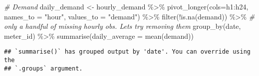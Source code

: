 \documentclass[
]{article}
\newenvironment{Shaded}{\begin{snugshade}}{\end{snugshade}}
\newcommand{\AttributeTok}[1]{\textcolor[rgb]{0.77,0.63,0.00}{#1}}
\newcommand{\CommentTok}[1]{\textcolor[rgb]{0.56,0.35,0.01}{\textit{#1}}}
\newcommand{\FunctionTok}[1]{\textcolor[rgb]{0.00,0.00,0.00}{#1}}
\newcommand{\NormalTok}[1]{#1}
\newcommand{\OtherTok}[1]{\textcolor[rgb]{0.56,0.35,0.01}{#1}}
\newcommand{\SpecialCharTok}[1]{\textcolor[rgb]{0.00,0.00,0.00}{#1}}
\newcommand{\StringTok}[1]{\textcolor[rgb]{0.31,0.60,0.02}{#1}}
\begin{document}
\begin{Shaded}
\begin{Highlighting}[]
\CommentTok{\# Demand}
\NormalTok{daily\_demand }\OtherTok{\textless{}{-}}\NormalTok{ hourly\_demand }\SpecialCharTok{\%\textgreater{}\%}
  \FunctionTok{pivot\_longer}\NormalTok{(}\AttributeTok{cols=}\NormalTok{h1}\SpecialCharTok{:}\NormalTok{h24, }\AttributeTok{names\_to =} \StringTok{"hour"}\NormalTok{, }\AttributeTok{values\_to =} \StringTok{"demand"}\NormalTok{) }\SpecialCharTok{\%\textgreater{}\%}
  \FunctionTok{filter}\NormalTok{(}\SpecialCharTok{!}\FunctionTok{is.na}\NormalTok{(demand)) }\SpecialCharTok{\%\textgreater{}\%} \CommentTok{\# only a handful of missing hourly obs. Let\textquotesingle{}s try removing them}
  \FunctionTok{group\_by}\NormalTok{(date, meter\_id) }\SpecialCharTok{\%\textgreater{}\%}
  \FunctionTok{summarise}\NormalTok{(}\AttributeTok{daily\_average =} \FunctionTok{mean}\NormalTok{(demand))}
\end{Highlighting}
\end{Shaded}

\begin{verbatim}
## `summarise()` has grouped output by 'date'. You can override using the
## `.groups` argument.
\end{verbatim}
\end{document}
